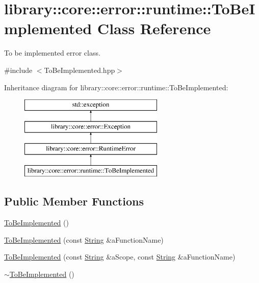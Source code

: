 \hypertarget{classlibrary_1_1core_1_1error_1_1runtime_1_1ToBeImplemented}{}\section{library\+:\+:core\+:\+:error\+:\+:runtime\+:\+:To\+Be\+Implemented Class Reference}
\label{classlibrary_1_1core_1_1error_1_1runtime_1_1ToBeImplemented}


To be implemented error class.  




{\ttfamily \#include $<$To\+Be\+Implemented.\+hpp$>$}

Inheritance diagram for library\+:\+:core\+:\+:error\+:\+:runtime\+:\+:To\+Be\+Implemented\+:\begin{figure}[H]
\begin{center}
\leavevmode
\includegraphics[height=4.000000cm]{classlibrary_1_1core_1_1error_1_1runtime_1_1ToBeImplemented}
\end{center}
\end{figure}
\subsection*{Public Member Functions}
\begin{DoxyCompactItemize}
\item 
\hyperlink{classlibrary_1_1core_1_1error_1_1runtime_1_1ToBeImplemented_aa98b3ae5c0ee3329a09b4b03bf27cf85}{To\+Be\+Implemented} ()
\item 
\hyperlink{classlibrary_1_1core_1_1error_1_1runtime_1_1ToBeImplemented_aee7854f221ff5bdade9cb8d67267b6ba}{To\+Be\+Implemented} (const \hyperlink{classlibrary_1_1core_1_1types_1_1String}{String} \&a\+Function\+Name)
\item 
\hyperlink{classlibrary_1_1core_1_1error_1_1runtime_1_1ToBeImplemented_a97439e9669fa5c1926de93fc0446f583}{To\+Be\+Implemented} (const \hyperlink{classlibrary_1_1core_1_1types_1_1String}{String} \&a\+Scope, const \hyperlink{classlibrary_1_1core_1_1types_1_1String}{String} \&a\+Function\+Name)
\item 
\hyperlink{classlibrary_1_1core_1_1error_1_1runtime_1_1ToBeImplemented_a4d6d8204b46f1f5eb41458849a891787}{$\sim$\+To\+Be\+Implemented} ()
\end{DoxyCompactItemize}


